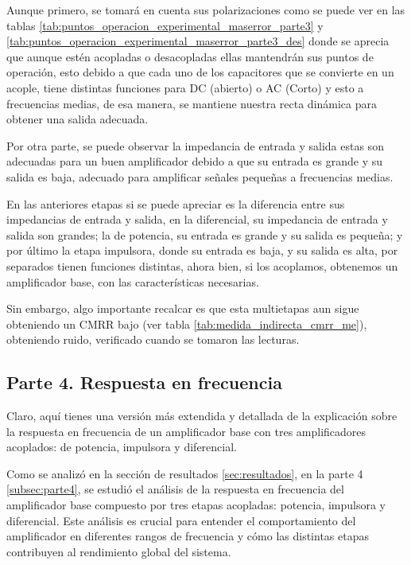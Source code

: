 Aunque primero, se tomará en cuenta sus polarizaciones como se puede ver en las tablas \ref{tab:puntos_operacion_experimental_maserror_parte3} y \ref{tab:puntos_operacion_experimental_maserror_parte3_des} donde se aprecia que aunque estén acopladas o desacopladas ellas mantendrán sus puntos de operación, esto debido a que cada uno de los capacitores que se convierte en un acople, tiene distintas funciones para DC (abierto) o AC (Corto) y esto a frecuencias medias, de esa manera, se mantiene nuestra recta dinámica para obtener una salida adecuada.

Por otra parte, se puede observar la impedancia de entrada y salida estas son adecuadas para un buen amplificador debido a que su entrada es grande y su salida es baja, adecuado para amplificar señales pequeñas a frecuencias medias.

En las anteriores etapas si se puede apreciar es la diferencia entre sus impedancias de entrada y salida, en la diferencial, su impedancia de entrada y salida son grandes; la de potencia, su entrada es grande y su salida es pequeña; y por último la etapa impulsora, donde su entrada es baja, y su salida es alta, por separados tienen funciones distintas, ahora bien, si los acoplamos, obtenemos un amplificador base, con las características necesarias.

Sin embargo, algo importante recalcar es que esta multietapas aun sigue obteniendo un CMRR bajo (ver tabla \ref{tab:medida_indirecta_cmrr_me}), obteniendo ruido, verificado cuando se tomaron las lecturas.

\subsection{Parte 4. Respuesta en frecuencia}


Claro, aquí tienes una versión más extendida y detallada de la explicación sobre la respuesta en frecuencia de un amplificador base con tres amplificadores acoplados: de potencia, impulsora y diferencial.

Como se analizó en la sección de resultados \ref{sec:resultados}, en la parte 4 \ref{subsec:parte4}, se estudió el análisis de la respuesta en frecuencia del amplificador base compuesto por tres etapas acopladas: potencia, impulsora y diferencial. Este análisis es crucial para entender el comportamiento del amplificador en diferentes rangos de frecuencia y cómo las distintas etapas contribuyen al rendimiento global del sistema.

